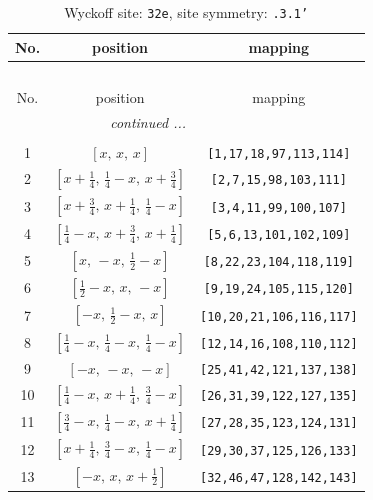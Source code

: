 \documentclass[fleqn,8pt]{jsarticle}
\begin{document}
\begin{longtable}{ccc}
\caption{Wyckoff site: {\tt 32e}, site symmetry: {\tt .3.1'}}
 \\
 \hline \hline
No. & position & mapping \\ \hline \endfirsthead

\multicolumn{2}{l}{\tablename\ \thetable{}} \\
 \hline \hline
No. & position & mapping \\ \hline \endhead

 \hline \hline
\multicolumn{2}{r}{\footnotesize\it continued ...} \\ \endfoot

 \hline \hline
\multicolumn{2}{r}{} \\ \endlastfoot

1 & $\left[ x,\, x,\, x \right]$ & {\tt [1,17,18,97,113,114]} \\ \hline
2 & $\left[ x + \frac{1}{4},\, \frac{1}{4} - x,\, x + \frac{3}{4} \right]$ & {\tt [2,7,15,98,103,111]} \\ \hline
3 & $\left[ x + \frac{3}{4},\, x + \frac{1}{4},\, \frac{1}{4} - x \right]$ & {\tt [3,4,11,99,100,107]} \\ \hline
4 & $\left[ \frac{1}{4} - x,\, x + \frac{3}{4},\, x + \frac{1}{4} \right]$ & {\tt [5,6,13,101,102,109]} \\ \hline
5 & $\left[ x,\, - x,\, \frac{1}{2} - x \right]$ & {\tt [8,22,23,104,118,119]} \\ \hline
6 & $\left[ \frac{1}{2} - x,\, x,\, - x \right]$ & {\tt [9,19,24,105,115,120]} \\ \hline
7 & $\left[ - x,\, \frac{1}{2} - x,\, x \right]$ & {\tt [10,20,21,106,116,117]} \\ \hline
8 & $\left[ \frac{1}{4} - x,\, \frac{1}{4} - x,\, \frac{1}{4} - x \right]$ & {\tt [12,14,16,108,110,112]} \\ \hline
9 & $\left[ - x,\, - x,\, - x \right]$ & {\tt [25,41,42,121,137,138]} \\ \hline
10 & $\left[ \frac{1}{4} - x,\, x + \frac{1}{4},\, \frac{3}{4} - x \right]$ & {\tt [26,31,39,122,127,135]} \\ \hline
11 & $\left[ \frac{3}{4} - x,\, \frac{1}{4} - x,\, x + \frac{1}{4} \right]$ & {\tt [27,28,35,123,124,131]} \\ \hline
12 & $\left[ x + \frac{1}{4},\, \frac{3}{4} - x,\, \frac{1}{4} - x \right]$ & {\tt [29,30,37,125,126,133]} \\ \hline
13 & $\left[ - x,\, x,\, x + \frac{1}{2} \right]$ & {\tt [32,46,47,128,142,143]} \\ \hline

\end{longtable}
\end{document}
